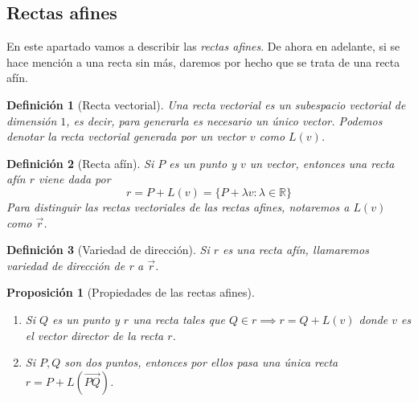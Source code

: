 \documentclass[11pt, a4paper]{article}
\newif\IfInSansMode
\newcommand{\R}{\mathbb{R}}
\renewcommand{\vec}{\overrightarrow}
\theoremstyle{theorem-style}
\newtheorem{nprop}{Proposición}[section]
\theoremstyle{definition-style}
\newtheorem{ndef}{Definición}[section]
\theoremstyle{remark-style}
\theoremstyle{example-style}
\newenvironment{nlist}
{\begin{enumerate}
    \renewcommand\labelenumi{(\emph{\roman{enumi})}}}
  {\end{enumerate}}
\begin{document}



\subsection{Rectas afines}

En este apartado vamos a describir las \textit{rectas afines}. De ahora en adelante, si se hace mención a una recta sin más, daremos por hecho que se trata de una recta afín.

\begin{ndef}[Recta vectorial]
  Una recta vectorial es un subespacio vectorial de dimensión $1$, es decir, para generarla es necesario un único vector. Podemos denotar la recta vectorial generada por un vector $v$ como $L(v)$.
\end{ndef}

\begin{ndef}[Recta afín]
  Si $P$ es un punto y $v$ un vector, entonces una recta afín $r$ viene dada por
  \[
    r = P+L(v) = \{P + \lambda v : \lambda \in \R\}
  \]
  Para distinguir las rectas vectoriales de las rectas afines, notaremos a $L(v)$ como $\vec{r}$.
\end{ndef}

\begin{ndef}[Variedad de dirección]
  Si $r$ es una \textit{recta afín}, llamaremos \textit{variedad de dirección de r} a $\vec{r}$.
\end{ndef}

\begin{nprop}[Propiedades de las rectas afines]\hfill
\begin{nlist}
\item Si $Q$ es un punto y $r$ una recta tales que $Q\in r \implies r = Q +L(v)$ donde $v$ es el vector director de la recta $r$.
\item Si $P,Q$ son dos puntos, entonces por ellos pasa una única recta $r = P +L(\overrightarrow{PQ})$. \\
 
\end{nlist}
\end{nprop}
\end{document}
